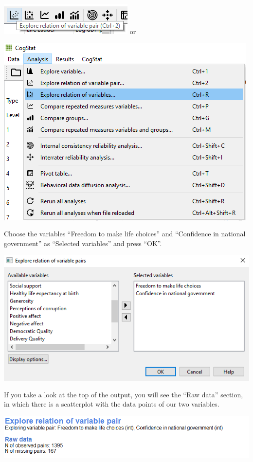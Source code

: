\documentclass[
]{book}
\begin{document}
\includegraphics{img/ch3/variablepair.png}
or

\includegraphics{img/ch3/variablepair2.png}

Choose the variables ``Freedom to make life choices'' and ``Confidence in national government'' as ``Selected variables'' and press ``OK''.

\includegraphics{img/ch3/variablepair3.png}

If you take a look at the top of the output, you will see the ``Raw data'' section, in which there is a scatterplot with the data points of our two variables.

\includegraphics{img/ch3/vpraw.png}
\end{document}

